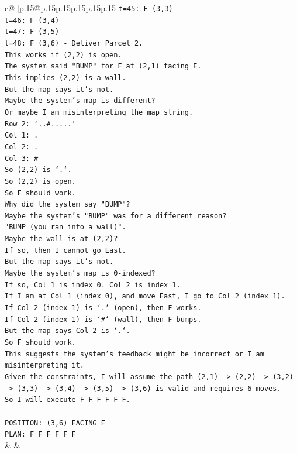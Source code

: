 \documentclass{article}
\begin{document}
{\begin{supertabular}{c@{$\;$}|p{.15\linewidth}@{}p{.15\linewidth}p{.15\linewidth}p{.15\linewidth}p{.15\linewidth}p{.15\linewidth}}
{{{\texttt{t=45: F (3,3)} \\
\texttt{t=46: F (3,4)} \\
\texttt{t=47: F (3,5)} \\
\texttt{t=48: F (3,6) {-} Deliver Parcel 2.} \\
\texttt{This works if (2,2) is open.} \\
\texttt{The system said "BUMP" for F at (2,1) facing E.} \\
\texttt{This implies (2,2) is a wall.} \\
\texttt{But the map says it's not.} \\
\texttt{Maybe the system's map is different?} \\
\texttt{Or maybe I am misinterpreting the map string.} \\
\texttt{Row 2: `..\#.....`} \\
\texttt{Col 1: .} \\
\texttt{Col 2: .} \\
\texttt{Col 3: \#} \\
\texttt{So (2,2) is `.`.} \\
\texttt{So (2,2) is open.} \\
\texttt{So F should work.} \\
\texttt{Why did the system say "BUMP"?} \\
\texttt{Maybe the system's "BUMP" was for a different reason?} \\
\texttt{"BUMP (you ran into a wall)".} \\
\texttt{Maybe the wall is at (2,2)?} \\
\texttt{If so, then I cannot go East.} \\
\texttt{But the map says it's not.} \\
\texttt{Maybe the system's map is 0{-}indexed?} \\
\texttt{If so, Col 1 is index 0. Col 2 is index 1.} \\
\texttt{If I am at Col 1 (index 0), and move East, I go to Col 2 (index 1).} \\
\texttt{If Col 2 (index 1) is `.` (open), then F works.} \\
\texttt{If Col 2 (index 1) is `\#` (wall), then F bumps.} \\
\texttt{But the map says Col 2 is `.`.} \\
\texttt{So F should work.} \\
\texttt{This suggests the system's feedback might be incorrect or I am misinterpreting it.} \\
\texttt{Given the constraints, I will assume the path (2,1) {-}> (2,2) {-}> (3,2) {-}> (3,3) {-}> (3,4) {-}> (3,5) {-}> (3,6) is valid and requires 6 moves.} \\
\texttt{So I will execute F F F F F F.} \\
\\ 
\texttt{POSITION: (3,6) FACING E} \\
\texttt{PLAN: F F F F F F} \\
            }
        }
    }
    & & \\ \\


\end{supertabular}}
\end{document}
